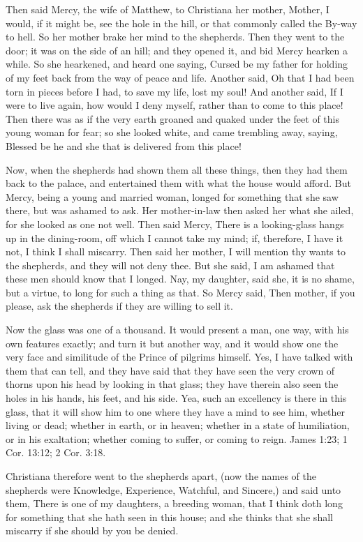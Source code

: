 Then said Mercy, the wife of Matthew, to Christiana her mother, Mother, I would, if it might be, see the hole in the hill, or that commonly called the By-way to hell. So her mother brake her mind to the shepherds. Then they went to the door; it was on the side of an hill; and they opened it, and bid Mercy hearken a while. So she hearkened, and heard one saying, Cursed be my father for holding of my feet back from the way of peace and life. Another said, Oh that I had been torn in pieces before I had, to save my life, lost my soul! And another said, If I were to live again, how would I deny myself, rather than to come to this place! Then there was as if the very earth groaned and quaked under the feet of this young woman for fear; so she looked white, and came trembling away, saying, Blessed be he and she that is delivered from this place!

Now, when the shepherds had shown them all these things, then they had them back to the palace, and entertained them with what the house would afford. But Mercy, being a young and married woman, longed for something that she saw there, but was ashamed to ask. Her mother-in-law then asked her what she ailed, for she looked as one not well. Then said Mercy, There is a looking-glass hangs up in the dining-room, off which I cannot take my mind; if, therefore, I have it not, I think I shall miscarry. Then said her mother, I will mention thy wants to the shepherds, and they will not deny thee. But she said, I am ashamed that these men should know that I longed. Nay, my daughter, said she, it is no shame, but a virtue, to long for such a thing as that. So Mercy said, Then mother, if you please, ask the shepherds if they are willing to sell it.

Now the glass was one of a thousand. It would present a man, one way, with his own features exactly; and turn it but another way, and it would show one the very face and similitude of the Prince of pilgrims himself. Yes, I have talked with them that can tell, and they have said that they have seen the very crown of thorns upon his head by looking in that glass; they have therein also seen the holes in his hands, his feet, and his side. Yea, such an excellency is there in this glass, that it will show him to one where they have a mind to see him, whether living or dead; whether in earth, or in heaven; whether in a state of humiliation, or in his exaltation; whether coming to suffer, or coming to reign. James 1:23; 1 Cor. 13:12; 2 Cor. 3:18.

Christiana therefore went to the shepherds apart, (now the names of the shepherds were Knowledge, Experience, Watchful, and Sincere,) and said unto them, There is one of my daughters, a breeding woman, that I think doth long for something that she hath seen in this house; and she thinks that she shall miscarry if she should by you be denied.

